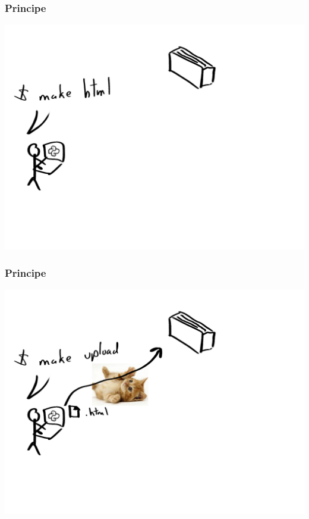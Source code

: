 \documentclass[frenchb,francais]{beamer}
\begin{document}
\begin{frame}
    \frametitle{Principe}
    \begin{center}\includegraphics[scale=.20]{img/static-generation_1.png}\end{center}
\end{frame}

\begin{frame}
    \frametitle{Principe}
    \begin{center}\includegraphics[scale=.20]{img/static-generation_2.png}\end{center}
\end{frame}
\end{document}
